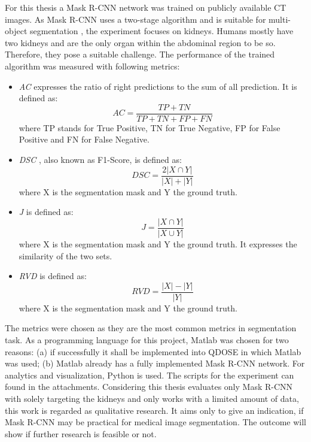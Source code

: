 

For this thesis a Mask R-CNN  network was trained on publicly available \ac{CT} images. As Mask R-CNN uses a two-stage algorithm and is suitable for multi-object segmentation \cite{Shu.2020}, the experiment focuses on kidneys. Humans mostly have two kidneys and are the only organ within the abdominal region to be so. Therefore, they pose a suitable challenge. The performance of the trained algorithm was measured with following metrics:

\begin{itemize}

    \item \textit{\ac{AC}} expresses the ratio of right predictions to the sum of all prediction. It is defined as:
    \begin{equation}
        AC = \frac{TP + TN}{TP+TN+FP+FN}  
    \end{equation}
    where TP stands for True Positive, TN for True Negative, FP for False Positive and FN for False Negative.
    
    \item \textit{ \ac{DSC} } \cite{Sasaki.2007, Dice.1945}, also known as F1-Score, is defined as: 
    \begin{equation}  
        DSC = \frac{2\left |X\cap Y\right |}{\left | X \right | + \left | Y \right |} 
    \end{equation} 
    where X is the segmentation mask and Y the ground truth.
    
    \item \textit{\ac{J}} \cite{Jaccard.1912} is defined as: 
    \begin{equation} 
        J = \frac{\left |X\cap Y\right |}{\left | X\cup  Y \right |}   
    \end{equation}
    where X is the segmentation mask and Y the ground truth. It expresses the similarity of the two sets.
    
    
    \item \textit{\ac{RVD}} \cite{Nai.2021, Heimann.2009} is defined as:
    \begin{equation}
        RVD = \frac{\left |X \right | - \left | Y \right |}{\left |   Y \right |}  
    \end{equation}
    where X is the segmentation mask and Y the ground truth.

    
\end{itemize}

The metrics were chosen as they are the most common metrics in segmentation task. As a programming language for this project, Matlab was chosen for two reasons: (a) if successfully it shall be implemented into QDOSE \cite{.23Aug22} in which Matlab was used; (b) Matlab already has a fully implemented Mask R-CNN network. For analytics and visualization, Python is used. The scripts for the experiment can found in the attachments. Considering this thesis evaluates only Mask R-CNN with solely targeting the kidneys and only works with a limited amount of data, this work is regarded as qualitative research.
It aims only to give an indication, if Mask R-CNN may be practical for medical image segmentation. The outcome will show if further research is feasible or not.


